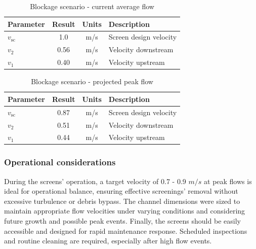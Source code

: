 \documentclass[11pt]{article}
\begin{document}
\begin{table}[h]
\centering
\caption{Blockage scenario - current average flow}
\label{tab:velocities_current}
\begin{tabular}{|l|c|c|l|}
\hline
\textbf{Parameter} & \textbf{Result} & \textbf{Units} & \textbf{Description} \\
\hline
$v_{\text{sc}}$ & 
1.0
& m/s & Screen design velocity\\
$v_2$ &
0.56
& m/s & Velocity downstream\\
$v_1$ &
0.40
& m/s & Velocity upstream\\
\hline
\end{tabular}
\end{table}

\begin{table}[h]
\centering
\caption{Blockage scenario - projected peak flow}
\label{tab:velocities_projected}
\begin{tabular}{|l|c|c|l|}
\hline
\textbf{Parameter} & \textbf{Result} & \textbf{Units} & \textbf{Description} \\
\hline
$v_{\text{sc}}$ & 
0.87
& m/s & Screen design velocity\\
$v_2$ &
0.51
& m/s & Velocity downstream\\
$v_1$ &
0.44
& m/s & Velocity upstream\\
\hline
\end{tabular}
\end{table}


\subsubsection{Operational considerations}
\label{sec:screens_operational_considerations}

During the screens' operation, a target velocity of 0.7 - 0.9 $m/s$ at peak 
flows is ideal for operational balance, ensuring effective screenings' removal without 
excessive turbulence or debris bypass. The channel dimensions were sized to 
maintain appropriate flow velocities under varying conditions and considering 
future growth and possible peak events. Finally, the screens should be 
easily accessible and designed for rapid maintenance response. Scheduled inspections 
and routine cleaning are required, especially after high flow events.
\end{document}
